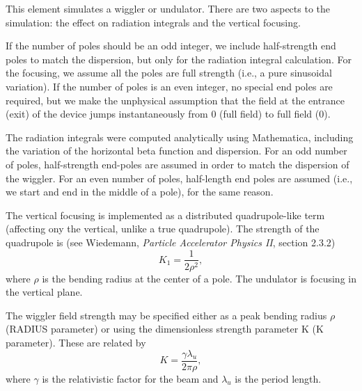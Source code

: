 This element simulates a wiggler or undulator.  There are two aspects
to the simulation: the effect on radiation integrals and the vertical
focusing. 

If the number of poles should be an odd integer, we include
half-strength end poles to match the dispersion, but only for the
radiation integral calculation.  For the focusing, we assume all the
poles are full strength (i.e., a pure sinusoidal variation).  If the
number of poles is an even integer, no special end poles are required,
but we make the unphysical assumption that the field at the entrance
(exit) of the device jumps instantaneously from 0 (full field) to full
field (0).

The radiation integrals were computed analytically using Mathematica,
including the variation of the horizontal beta function and dispersion. 
For an odd number of poles, half-strength end-poles are assumed in order
to match the dispersion of the wiggler.  For an even number of poles,
half-length end poles are assumed (i.e., we start and end in 
the middle of a pole), for the same reason.

The vertical focusing is implemented as a distributed quadrupole-like
term (affecting ony the vertical, unlike a true quadrupole).  The
strength of the quadrupole is (see Wiedemann, {\em Particle Accelerator
Physics II}, section 2.3.2)
\begin{equation}
K_1 = \frac{1}{2\rho^2},
\end{equation}
where $\rho$ is the bending radius at the center of a pole.  The
undulator is focusing in the vertical plane.

The wiggler field strength may be specified either as a peak bending 
radius $\rho$ (RADIUS parameter) or using the dimensionless strength parameter
K (K parameter).  These are related by
\begin{equation}
K = \frac{\gamma \lambda_u}{2 \pi \rho},
\end{equation}
where $\gamma$ is the relativistic factor for the beam and $\lambda_u$ is
the period length.

